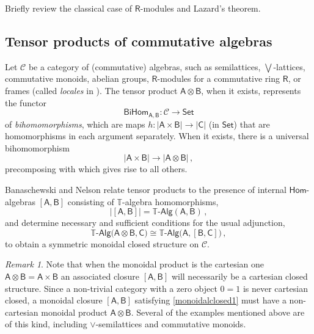 \documentclass[12pt]{article}
\newcommand{\T}{\ensuremath{\mathbb{T}}}
\newcommand{\CC}{\ensuremath{\mathcal{C}}}
\newcommand{\Set}{\ensuremath{\mathsf{Set}}}
\newcommand{\Hom}{\ensuremath{\mathsf{Hom}}}
\newcommand{\TAlg}{\ensuremath{\T\text{-}\mathsf{Alg}}}
\newcommand{\alg}[1]{\ensuremath{\mathsf{#1}}}
\renewcommand{\to}{\ensuremath{\rightarrow}}
\theoremstyle{remark}
\newtheorem{remark}[theorem]{Remark}
\theoremstyle{definition}
\begin{document}
{Briefly review the classical case of $\alg{R}$-modules and Lazard's theorem.

\subsection{Tensor products of commutative algebras}

Let $\CC$ be a category of (commutative) algebras, such as semilattices, $\bigvee$-lattices, commutative monoids, abelian groups, $\alg{R}$-modules for a commutative ring $\alg{R}$, or frames (called \emph{locales} in \cite{JT}).  The tensor product $\alg{A}\otimes\alg{B}$, when it exists, represents the functor $$\alg{BiHom}_{\alg{A},\alg{B}}: \CC \to\Set$$ of \emph{bihomomorphisms}, which are maps $h : |\alg{A}\times\alg{B}| \to |\alg{C}|$ (in $\Set$) that are homomorphisms in each argument separately.   When it exists, there is a universal bihomomorphism
\[
|\alg{A} \times \alg{B}| \to |\alg{A}\otimes\alg{B}| \,,
\]
precomposing with which gives rise to all others. 

Banaschewski and Nelson \cite{Tensor products and bimorphisms, Canadian Math. Bull. 19(4) (1976).} relate tensor products to the presence of internal $\Hom$-algebras $[\alg{A},\alg{B}]$ consisting of $\T$-algebra homomorphisms, 
\begin{equation*}\label{monoidalclosed}
|[\alg{A},\alg{B}]| = \TAlg(\alg{A},\alg{B})\,,
\end{equation*}
and determine necessary and sufficient conditions for the usual adjunction, 
\begin{equation}\label{monoidalclosed1}
\TAlg\big(\alg{A}\otimes\alg{B},\alg{C}\big) \cong \TAlg\big(\alg{A}, [\alg{B},\alg{C}]\big)\,,
\end{equation}
to obtain a symmetric monoidal closed structure on $\CC$.  

\begin{remark}\label{remark:noCCCwithzero}
Note that when the monoidal product is the cartesian one $\alg{A}\otimes\alg{B} = \alg{A}\times\alg{B}$ an associated closure $[\alg{A},\alg{B}]$ will necessarily be a cartesian closed structure.  Since a non-trivial category with a zero object $0=1$ is never cartesian closed, a monoidal closure $[\alg{A},\alg{B}]$ satisfying \eqref{monoidalclosed1} must have a non-cartesian monoidal product $\alg{A}\otimes\alg{B}$. Several of the examples mentioned above are of this kind,  including $\vee$-semilattices and commutative monoids.
\end{remark}

}
\end{document}
